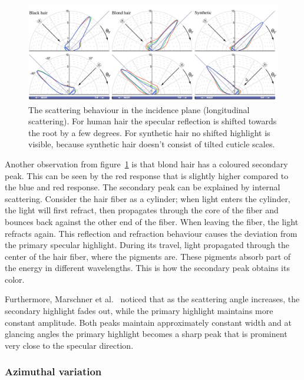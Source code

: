 \documentclass[11pt,a4paper]{report}
\begin{document}
\begin{figure}[h]
\begin{center}
\includegraphics[scale=0.35]{images/longitudinal_response.jpeg}
\caption{The scattering behaviour in the incidence plane (longitudinal scattering). For human hair the specular reflection is shifted towards the root by a few degrees. For synthetic hair no shifted highlight is visible, because synthetic hair doesn't consist of tilted cuticle scales.}
\label{fig_longitudinal_marschner}
\end{center}
\end{figure}

Another observation from figure~\ref{fig_longitudinal_marschner} is that blond hair has a coloured secondary peak. This can be seen by the red response that is slightly higher compared to the blue and red response. The secondary peak can be explained by internal scattering. Consider the hair fiber as a cylinder; when light enters the cylinder, the light will first refract, then propagates through the core of the fiber and bounces back against the other end of the fiber. When leaving the fiber, the light refracts again. This reflection and refraction behaviour causes the deviation from the primary specular highlight. During its travel, light propagated through the center of the hair fiber, where the pigments are. These pigments absorb part of the energy in different wavelengths. This is how the secondary peak obtains its color.

Furthermore, Marschner et al.~\cite{marschner} noticed that as the scattering angle increases, the secondary highlight fades out, while the primary highlight maintains more constant amplitude. Both peaks maintain approximately constant width and at glancing angles the primary highlight becomes a sharp peak that is prominent very close to the specular direction. 


\subsubsection{Azimuthal variation}
\end{document}
